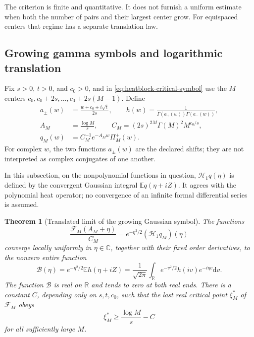\documentclass[11pt]{article}
\newtheorem{theorem}{Theorem}[section]
\theoremstyle{definition}
\theoremstyle{remark}
\newcommand{\R}{\mathbb R}
\newcommand{\C}{\mathbb C}
\newcommand{\E}{\mathbb E}
\newcommand{\dd}{\mathrm d}
\begin{document}
The criterion is finite and quantitative.  It does not furnish a
uniform estimate when both the number of pairs and their largest
center grow.  For equispaced centers that regime has a separate
translation law.

\subsection{Growing gamma symbols and logarithmic translation}
\label{subsec:heatblock-growing-symbol}

Fix $s>0$, $t>0$, and $c_0>0$, and in
\eqref{eq:heatblock-critical-symbol} use the $M$ centers
$c_0,c_0+2s,\ldots,c_0+2s(M-1)$.  Define
\begin{equation}
 \begin{split}
 a_\pm(w)&=\frac{w+c_0\pm i\sqrt t}{2s},\qquad
 h(w)=\frac1{\Gamma(a_+(w))\Gamma(a_-(w))},\\
 A_M&=\frac{\log M}{s},\qquad
 C_M=(2s)^{2M}\Gamma(M)^2M^{c_0/s},\\
 q_M(w)&=C_M^{-1}e^{-A_Mw}\Pi_M^+(w).
 \end{split}
 \label{eq:heatblock-growing-normalization}
\end{equation}
For complex $w$, the two functions $a_\pm(w)$ are the declared shifts;
they are not interpreted as complex conjugates of one another.

In this subsection, on the nonpolynomial functions in question,
$\mathcal H_1q(\eta)$ is defined by the convergent Gaussian integral
$\E q(\eta+iZ)$.  It agrees with the polynomial heat operator; no
convergence of an infinite formal differential series is assumed.

\begin{theorem}[Translated limit of the growing Gaussian symbol]
\label{thm:heatblock-growing-symbol}
The functions
\begin{equation}
 \frac{\mathscr F_M(A_M+\eta)}{C_M}
 =e^{-\eta^2/2}(\mathcal H_1q_M)(\eta)
 \label{eq:heatblock-growing-exact-shift}
\end{equation}
converge locally uniformly in $\eta\in\C$, together with their fixed
order derivatives, to the nonzero entire function
\begin{equation}
 \mathscr B(\eta)=e^{-\eta^2/2}\E h(\eta+iZ)
 =\frac1{\sqrt{2\pi}}\int_\R e^{-v^2/2}h(iv)e^{-i\eta v}\dd v.
 \label{eq:heatblock-growing-limit}
\end{equation}
The function $\mathscr B$ is real on $\R$ and tends to zero at both
real ends.  There is a constant $C$, depending only on $s,t,c_0$, such
that the last real critical point $\xi_M^*$ of $\mathscr F_M$ obeys
\begin{equation}
 \xi_M^*\ge\frac{\log M}{s}-C
 \label{eq:heatblock-growing-last-critical}
\end{equation}
for all sufficiently large $M$.
\end{theorem}
\end{document}
